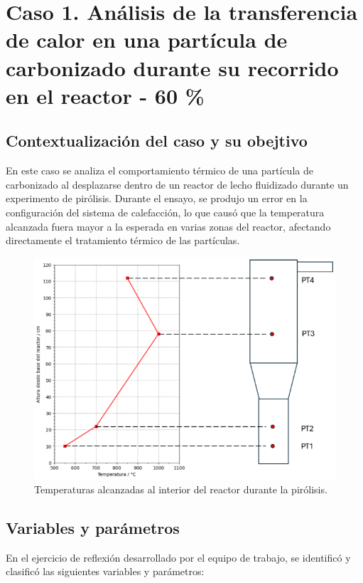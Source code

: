 \documentclass[11pt,stdletter,orderfromtodate,sigleft,twoside]{report}
\begin{document}
\newpage

\section{\textbf{Caso 1. Análisis de la transferencia de calor en una partícula de carbonizado durante su recorrido en el reactor - 60 \%} }

\subsection{Contextualización del caso y su obejtivo}

En este caso se analiza el comportamiento térmico de una partícula de carbonizado al desplazarse dentro de un reactor de lecho fluidizado durante un experimento de pirólisis. Durante el ensayo, se produjo un error en la configuración del sistema de calefacción, lo que causó que la temperatura alcanzada fuera mayor a la esperada en varias zonas del reactor, afectando directamente el tratamiento térmico de las partículas.


\begin{figure}[h!]
    \centering
    \includegraphics[width=0.6\linewidth]{figures/Caso1.png}
    \caption{Temperaturas alcanzadas al interior del reactor durante la pirólisis.}
    \label{Caso1}
\end{figure}

\subsection{Variables y parámetros}

En el ejercicio de reflexión desarrollado por el equipo de trabajo, se identificó y clasificó las siguientes variables y parámetros:
\end{document}
